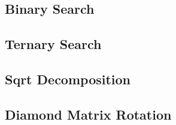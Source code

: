 		\subsection{Binary Search}
			
		\subsection{Ternary Search}
			
		\subsection{Sqrt Decomposition}
			
		\subsection{Diamond Matrix Rotation}
			
